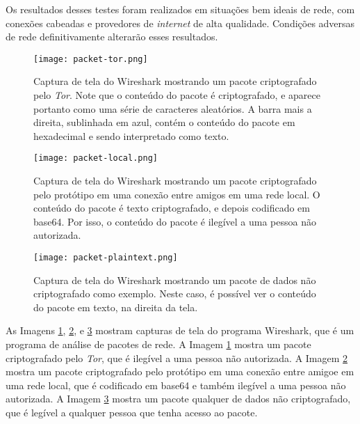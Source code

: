 Os resultados desses testes foram realizados em situações bem ideais de rede, com conexões cabeadas e provedores de \textit{internet} de alta qualidade. Condições adversas de rede definitivamente alterarão esses resultados.

\begin{figure}[H]
\centering
\texttt{[image: packet-tor.png]}
\caption{Captura de tela do Wireshark mostrando um pacote criptografado pelo \textit{Tor}. Note que o conteúdo do pacote é criptografado, e aparece portanto como uma série de caracteres aleatórios. A barra mais a direita, sublinhada em azul, contém o conteúdo do pacote em hexadecimal e sendo interpretado como texto.}
\label{fig:packet-tor}
\end{figure}

\begin{figure}[H]
\centering
\texttt{[image: packet-local.png]}
\caption{Captura de tela do Wireshark mostrando um pacote criptografado pelo protótipo em uma conexão entre amigos em uma rede local. O conteúdo do pacote é texto criptografado, e depois codificado em base64. Por isso, o conteúdo do pacote é ilegível a uma pessoa não autorizada.}
\label{fig:packet-local}
\end{figure}

\begin{figure}[H]
\centering
\texttt{[image: packet-plaintext.png]}
\caption{Captura de tela do Wireshark mostrando um pacote de dados não criptografado como exemplo. Neste caso, é possível ver o conteúdo do pacote em texto, na direita da tela.}
\label{fig:packet-plaintext}
\end{figure}

As Imagens \ref{fig:packet-tor}, \ref{fig:packet-local}, e \ref{fig:packet-plaintext} mostram capturas de tela do programa Wireshark, que é um programa de análise de pacotes de rede. A Imagem \ref{fig:packet-tor} mostra um pacote criptografado pelo \textit{Tor}, que é ilegível a uma pessoa não autorizada. A Imagem \ref{fig:packet-local} mostra um pacote criptografado pelo protótipo em uma conexão entre amigoe em uma rede local, que é codificado em base64 e também ilegível a uma pessoa não autorizada. A Imagem \ref{fig:packet-plaintext} mostra um pacote qualquer de dados não criptografado, que é legível a qualquer pessoa que tenha acesso ao pacote.